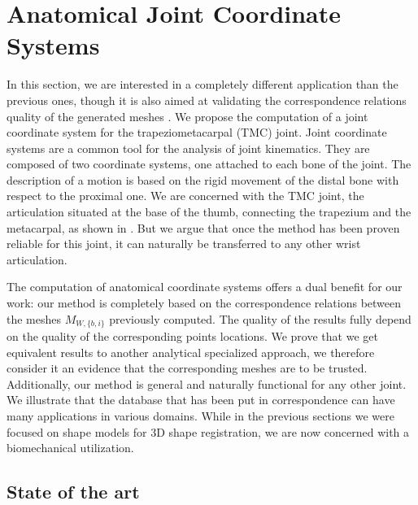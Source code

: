 \section{Anatomical Joint Coordinate Systems}
\label{sec:4_CoordSys}

In this section, we are interested in a completely different application than the previous ones, though it is also aimed at validating the correspondence relations quality of the generated meshes \mr*. We propose the computation of a joint coordinate system for the trapezio\-metacarpal (TMC) joint. Joint coordinate systems are a common tool for the analysis of joint kinematics. They are composed of two coordinate systems, one attached to each bone of the joint. The description of a motion is based on the rigid movement of the distal bone with respect to the proximal one. We are concerned with the TMC joint, the articulation situated at the base of the thumb, connecting the trapezium and the \first* metacarpal, as shown in . But we argue that once the method has been proven reliable for this joint, it can naturally be transferred to any other wrist articulation. 

The computation of anatomical coordinate systems offers a dual benefit for our work:
our method is completely based on the correspondence relations between the meshes $M_{W,\{b,i\}}$ previously computed. The quality of the results fully depend on the quality of the corresponding points locations. We prove that we get equivalent results to another analytical specialized approach, we therefore consider it an evidence that the corresponding meshes are to be trusted. Additionally, our method is general and naturally functional for any other joint. We illustrate that the database that has been put in correspondence can have many applications in various domains. While in the previous sections we were focused on shape models for 3D shape registration, we are now concerned with a biomechanical utilization. 


\subsection{State of the art}


